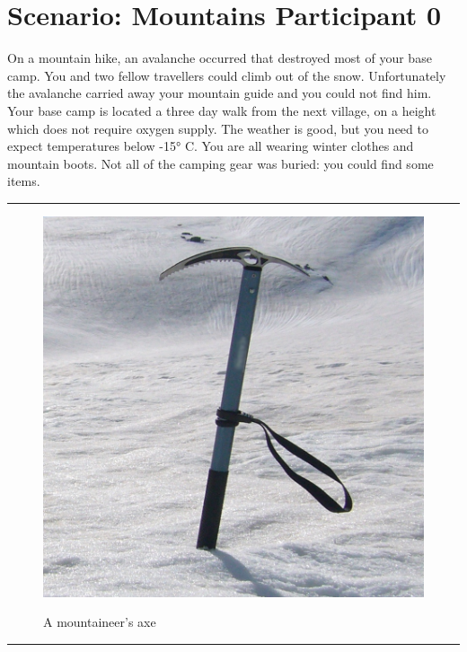 \documentclass{article}
\begin{document}
    \clearpage
    \section*{Scenario: \textmd{Mountains} \hfill Participant \textmd{0}}
    \Large On a mountain hike, an avalanche occurred that destroyed most of your base camp. You and two fellow travellers could climb out of the snow. Unfortunately the avalanche carried away your mountain guide and you could not find him. Your base camp is located a three day walk from the next village, on a height which does not require oxygen supply. The weather is good, but you need to expect temperatures below -15° C. You are all wearing winter clothes and mountain boots. Not all of the camping gear was buried: you could find some items.\clearpage
        \par\noindent\rule{\textwidth}{0.4pt}
    \begin{figure}[H]
        \centering
        \begin{minipage}{0.25\textwidth}
            \centering
            \includegraphics[width=\textwidth]{../SurvivalItemImages/mountainaxe}
        \end{minipage}\hfill
        \begin{minipage}{0.7\textwidth}
            \centering
            \Large A mountaineer's axe
        \end{minipage}
    \end{figure}
    \vspace{-0.8em}
    \noindent\rule{\textwidth}{0.4pt}
            
\end{document}
